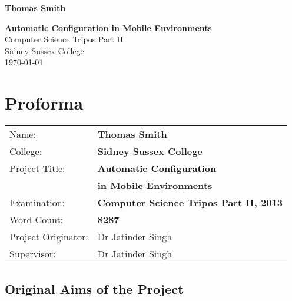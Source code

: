 \documentclass[12pt,twoside,notitlepage]{report}
\begin{document}





\pagestyle{empty}

\hfill{\LARGE \bf Thomas Smith}

\vspace*{60mm}
\begin{center}
\Huge
{\bf Automatic Configuration in Mobile Environments} \\
\vspace*{5mm}
Computer Science Tripos Part II \\
\vspace*{5mm}
Sidney Sussex College \\
\vspace*{5mm}
\today  %
\end{center}

\cleardoublepage


\setcounter{page}{1}
\pagestyle{plain}

\chapter*{Proforma}

{\large
\begin{tabular}{ll}
Name:               & \bf Thomas Smith	\\
College:            & \bf Sidney Sussex College	\\
Project Title:      & \bf Automatic Configuration \\ &\bf in Mobile Environments	\\
Examination:        & \bf Computer Science Tripos Part II, 2013 	\\
Word Count:         & \bf 8287\footnotemark[1] \\
Project Originator: & Dr Jatinder Singh		\\
Supervisor:         & Dr Jatinder Singh		\\ 
\end{tabular}
}



\section*{Original Aims of the Project}
\end{document}
